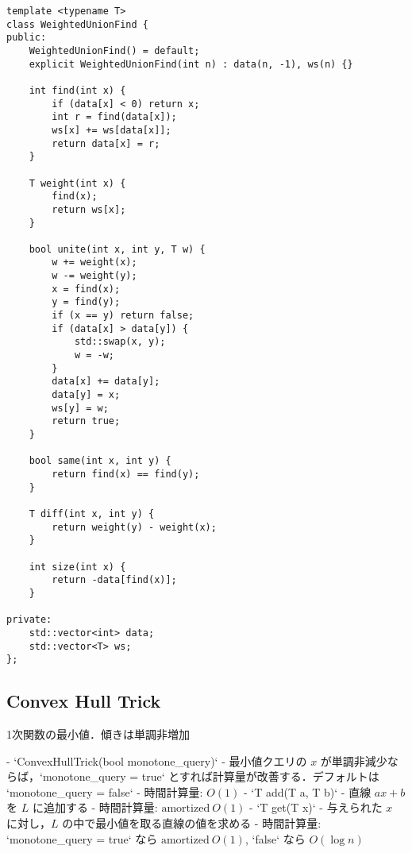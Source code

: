 \begin{lstlisting}
template <typename T>
class WeightedUnionFind {
public:
    WeightedUnionFind() = default;
    explicit WeightedUnionFind(int n) : data(n, -1), ws(n) {}

    int find(int x) {
        if (data[x] < 0) return x;
        int r = find(data[x]);
        ws[x] += ws[data[x]];
        return data[x] = r;
    }

    T weight(int x) {
        find(x);
        return ws[x];
    }

    bool unite(int x, int y, T w) {
        w += weight(x);
        w -= weight(y);
        x = find(x);
        y = find(y);
        if (x == y) return false;
        if (data[x] > data[y]) {
            std::swap(x, y);
            w = -w;
        }
        data[x] += data[y];
        data[y] = x;
        ws[y] = w;
        return true;
    }

    bool same(int x, int y) {
        return find(x) == find(y);
    }

    T diff(int x, int y) {
        return weight(y) - weight(x);
    }

    int size(int x) {
        return -data[find(x)];
    }

private:
    std::vector<int> data;
    std::vector<T> ws;
};
\end{lstlisting}

\subsection{Convex Hull Trick}

\begin{small}
\begin{markdown}
1次関数の最小値．傾きは単調非増加

- `ConvexHullTrick(bool monotone\_query)`
    - 最小値クエリの $x$ が単調非減少ならば，`monotone\_query = true` とすれば計算量が改善する．デフォルトは `monotone\_query = false`
    - 時間計算量: $O(1)$
- `T add(T a, T b)`
    - 直線 $ax + b$ を $L$ に追加する
    - 時間計算量: $\mathrm{amortized}\ O(1)$
- `T get(T x)`
    - 与えられた $x$ に対し，$L$ の中で最小値を取る直線の値を求める
    - 時間計算量: `monotone\_query = true` なら $\mathrm{amortized}\ O(1)$, `false` なら $O(\log n)$
\end{markdown}
\end{small}

